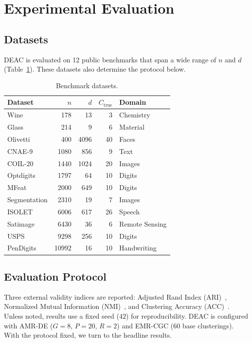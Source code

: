 \documentclass[journal]{IEEEtran}
\begin{document}
\section{Experimental Evaluation}\label{sec:exp}

\subsection{Datasets}

DEAC is evaluated on 12 public benchmarks that span a wide range of $n$ and $d$ (Table~\ref{tab:datasets}). These datasets also determine the protocol below.

\begin{table}[htbp]
\centering
\caption{Benchmark datasets.}
\label{tab:datasets}
\footnotesize
\setlength{\tabcolsep}{4pt}
\begin{tabular}{lrrrl}
\toprule
Dataset & $n$ & $d$ & $C_{\text{true}}$ & Domain \\
\midrule
Wine         & 178   & 13   & 3  & Chemistry \\
Glass        & 214   & 9    & 6  & Material \\
Olivetti     & 400   & 4096 & 40 & Faces \\
CNAE-9       & 1080  & 856  & 9  & Text \\
COIL-20      & 1440  & 1024 & 20 & Images \\
Optdigits    & 1797  & 64   & 10 & Digits \\
MFeat        & 2000  & 649  & 10 & Digits \\
Segmentation & 2310  & 19   & 7  & Images \\
ISOLET       & 6006  & 617  & 26 & Speech \\
Satimage     & 6430  & 36   & 6  & Remote Sensing \\
USPS         & 9298  & 256  & 10 & Digits \\
PenDigits    & 10992 & 16   & 10 & Handwriting \\
\bottomrule
\end{tabular}
\end{table}

\subsection{Evaluation Protocol}

Three external validity indices are reported: Adjusted Rand Index (ARI)~\cite{hubert1985comparing}, Normalized Mutual Information (NMI)~\cite{strehl2002cluster}, and Clustering Accuracy (ACC)~\cite{yang2010image}. Unless noted, results use a fixed seed ($42$) for reproducibility. DEAC is configured with AMR-DE ($G{=}8$, $P{=}20$, $R{=}2$) and EMR-CGC (60 base clusterings). With the protocol fixed, we turn to the headline results.
\end{document}
